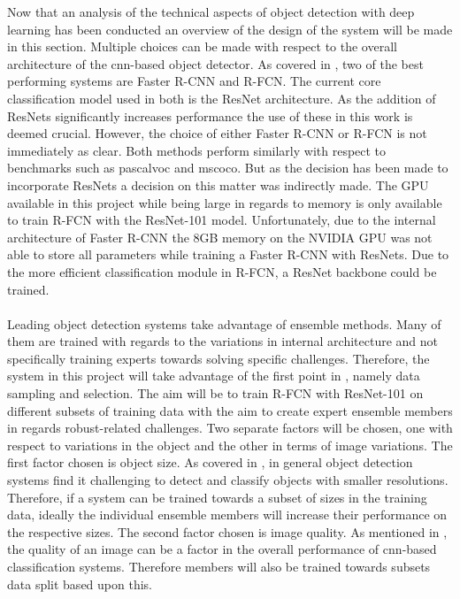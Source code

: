 Now that an analysis of the technical aspects of object detection with deep learning has been conducted an overview of the design of the system will be made in this section. 
Multiple choices can be made with respect to the overall architecture of the \gls{cnn}-based object detector. As covered in , two of the best performing systems are Faster R-CNN and R-FCN. The current core classification model used in both is the ResNet architecture. As the addition of ResNets significantly increases performance the use of these in this work is deemed crucial. However, the choice of either Faster R-CNN or R-FCN is not immediately as clear. Both methods perform similarly with respect to benchmarks such as \gls{pascalvoc} and \gls{mscoco}. But as the decision has been made to incorporate ResNets a decision on this matter was indirectly made. The GPU available in this project while being large in regards to memory is only available to train R-FCN with the ResNet-101 model. Unfortunately, due to the internal architecture of Faster R-CNN the 8GB memory on the NVIDIA GPU was not able to store all parameters while training a Faster R-CNN with ResNets. Due to the more efficient classification module in R-FCN, a ResNet backbone could be trained.
\\\\
Leading object detection systems take advantage of ensemble methods. Many of them are trained with regards to the variations in internal architecture and not specifically training experts towards solving specific challenges. Therefore, the system in this project will take advantage of the first point in , namely data sampling and selection. The aim will be to train R-FCN with ResNet-101 on different subsets of training data with the aim to create expert ensemble members in regards robust-related challenges. Two separate factors will be chosen, one with respect to variations in the object and the other in terms of image variations. The first factor chosen is object size. As covered in , in general object detection systems find it challenging to detect and classify objects with smaller resolutions. Therefore, if a system can be trained towards a subset of sizes in the training data, ideally the individual ensemble members will increase their performance on the respective sizes. The second factor chosen is image quality. As mentioned in , the quality of an image can be a factor in the overall performance of \gls{cnn}-based classification systems. Therefore members will also be trained towards subsets data split based upon this.
